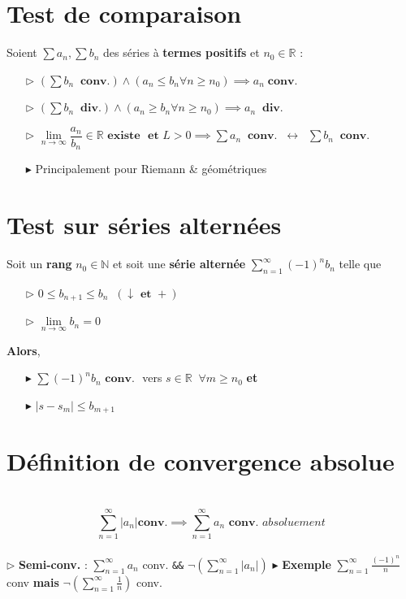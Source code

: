 \documentclass{report}
\begin{document}
\begin{multicols*}{3}
    
     \section{Test de comparaison}
     Soient $\sum a_n, \sum b_n$ des séries à \textbf{termes positifs} 
     et $n_0 \in \mathbb{R}$ :
     \begin{itemize}
         \item[$\rhd$ ] $\left(\sum   b_n  \;\; \textbf{conv.}\right) \land 
             (a_n \leq b_n \forall n \geq n_0) 
             \implies a_n \; \textbf{conv.}$ 
         \item[$\rhd$ ] $\left(\sum   b_n  \;\; \textbf{div.}\right) \land 
             (a_n \geq b_n \forall n \geq n_0) 
             \implies a_n \;\; \textbf{div.}$ 
         \item[$\rhd$ ] $\lim\limits_{n\to\infty}\dfrac{a_n}{b_n}
             \in \mathbb{R} \textbf{ existe } \textbf{ et } L > 0 
             \implies 
        \sum a_n \;\; \textbf{conv.} \;\; \leftrightarrow \;\; 
        \sum b_n \;\; \textbf{conv.}$ 
    \item[$\blacktriangleright$] Principalement pour Riemann \& géométriques
     \end{itemize}

     

     \section{Test sur séries alternées}
     Soit un \textbf{rang} $n_0 \in \mathbb{N}$ et 
     soit une \textbf{série alternée} 
     $\sum_{n=1}^{\infty } (-1)^nb_n$ telle que 
     \begin{itemize}
       \item [$\rhd$ ]  $0 \leq b_{n+1} \leq b_n \;\;(\downarrow \textbf{ et } +)$ 
       \item [$\rhd$ ] $\lim\limits_{n\to\infty }b_n = 0$ 
     \end{itemize}
     \textbf{Alors}, 
     \begin{itemize}
         \item[$\blacktriangleright$]
     $\sum  (-1)^nb_n \textbf{ conv. }$ vers $s \in
     \mathbb{R} \;\; \forall 
     m \geq n_0 $ \textbf{et}  
        \item[$\blacktriangleright$] 
    $|s - s_m| \leq b_{m+1}$
     \end{itemize}

  \section{Définition de convergence absolue}
     \mbox{}\\
     \[ \sum_{n=1}^{\infty }|a_n| \textbf{conv.} \implies \sum_{n=1}^{\infty }a_n  
     \textbf{ conv. } \textit{absoluement} \]
      \\
      $\rhd$  \textbf{Semi-conv.} : $\sum_{n=1}^{\infty }a_n$ conv. 
         \texttt{\&\&} $\neg(\sum_{n=1}^{\infty }|a_n|)$ 
      $\blacktriangleright$  \textbf{Exemple} $\sum_{n=1}^{\infty }\frac{(-1)^n}{n}$ conv 
          \textbf{mais} $\neg(\sum_{n=1}^{\infty }\frac{1}{n})$ conv.  


\end{multicols*}
\end{document}
